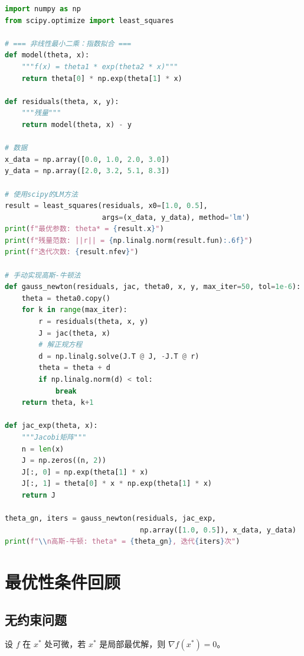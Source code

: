 \begin{lstlisting}[language=Python, caption=Levenberg-Marquardt实现]
import numpy as np
from scipy.optimize import least_squares

# === 非线性最小二乘：指数拟合 ===
def model(theta, x):
    """f(x) = theta1 * exp(theta2 * x)"""
    return theta[0] * np.exp(theta[1] * x)

def residuals(theta, x, y):
    """残量"""
    return model(theta, x) - y

# 数据
x_data = np.array([0.0, 1.0, 2.0, 3.0])
y_data = np.array([2.0, 3.2, 5.1, 8.3])

# 使用scipy的LM方法
result = least_squares(residuals, x0=[1.0, 0.5], 
                       args=(x_data, y_data), method='lm')
print(f"最优参数: theta* = {result.x}")
print(f"残量范数: ||r|| = {np.linalg.norm(result.fun):.6f}")
print(f"迭代次数: {result.nfev}")

# 手动实现高斯-牛顿法
def gauss_newton(residuals, jac, theta0, x, y, max_iter=50, tol=1e-6):
    theta = theta0.copy()
    for k in range(max_iter):
        r = residuals(theta, x, y)
        J = jac(theta, x)
        # 解正规方程
        d = np.linalg.solve(J.T @ J, -J.T @ r)
        theta = theta + d
        if np.linalg.norm(d) < tol:
            break
    return theta, k+1

def jac_exp(theta, x):
    """Jacobi矩阵"""
    n = len(x)
    J = np.zeros((n, 2))
    J[:, 0] = np.exp(theta[1] * x)
    J[:, 1] = theta[0] * x * np.exp(theta[1] * x)
    return J

theta_gn, iters = gauss_newton(residuals, jac_exp, 
                                np.array([1.0, 0.5]), x_data, y_data)
print(f"\\n高斯-牛顿: theta* = {theta_gn}, 迭代{iters}次")
\end{lstlisting}

\section{最优性条件回顾}\label{sec:optimality}

\subsection{无约束问题}

\begin{theorem}[无约束一阶必要条件]
设 $f$ 在 $x^*$ 处可微，若 $x^*$ 是局部最优解，则 $\nabla f(x^*) = 0$。
\end{theorem}

